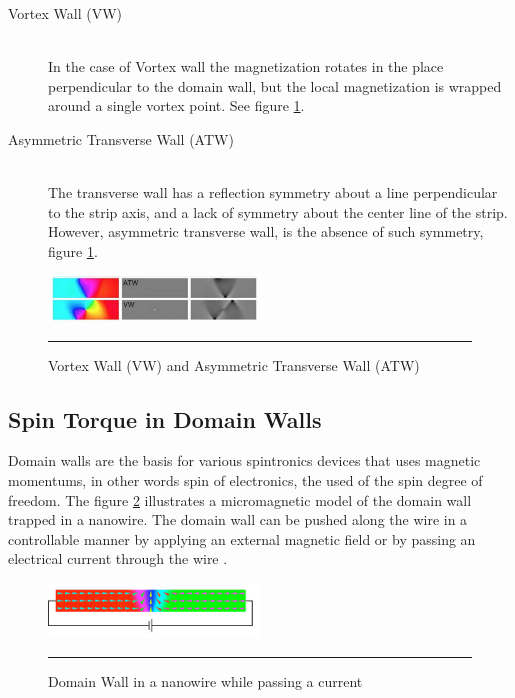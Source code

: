 \begin{description}
  \item[Vortex Wall (VW)] \hfill \\
   In the case of Vortex wall the magnetization rotates in the place perpendicular to the domain wall, but the local magnetization is wrapped around a single vortex point. See figure \ref{fig:dw}.
   
 \item[Asymmetric Transverse Wall (ATW)] \hfill \\
 The transverse wall has a reflection symmetry about a line perpendicular to the strip axis, and a lack of symmetry about the center line of the strip. However, asymmetric transverse wall, is the absence of such symmetry, figure \ref{fig:dw}.
\end{description}

\begin{figure}[htbp]
	\centering
		\includegraphics[width=0.5\textwidth]{Figures/dw.png}
		\rule{35em}{0.5pt}
	\caption[Domain Wall VW, ATW]{Vortex Wall (VW) and Asymmetric Transverse Wall (ATW)}
	\label{fig:dw}
\end{figure}

\subsection{Spin Torque in Domain Walls}

Domain walls are the basis for various spintronics devices that uses magnetic momentums, in other words spin of electronics, the used of the spin degree of freedom. The figure \ref{fig:DWspin} illustrates a micromagnetic model of the domain wall trapped in a nanowire. The domain wall can be pushed along the wire in a controllable manner by applying an external magnetic field or by passing an electrical current through the wire \cite{dwwire}.

\begin{figure}[htbp]
	\centering
		\includegraphics[width=0.5\textwidth]{Figures/DWspin.png}
		\rule{35em}{0.5pt}
	\caption[Domain Wall nanowire]{Domain Wall in a nanowire while passing a current}
	\label{fig:DWspin}
\end{figure}

